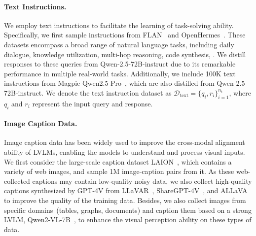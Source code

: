 
\paragraph{Text Instructions.} We employ text instructions to facilitate the learning of task-solving ability. 
Specifically, we first sample instructions from FLAN~\cite{longpre2023flan} and OpenHermes~\cite{OpenHermes2-5}. These datasets encompass a broad range of natural language tasks, including daily dialogue, knowledge utilization, multi-hop reasoning, code synthesis, \etc.
We distill responses to these queries from Qwen-2.5-72B-instruct due to its remarkable performance in multiple real-world tasks.
Additionally, we include 100K text instructions from Magpie-Qwen2.5-Pro~\cite{xu2024magpie}, which are also distilled from Qwen-2.5-72B-instruct.
We denote the text instruction dataset as $\mathcal{D}_{\text{text}} = \{q_i, r_i\}_{i=1}^{n_t}$, where $q_i$ and $r_i$ represent the input query and response. 


\paragraph{Image Caption Data.} 
Image caption data has been widely used to improve the cross-modal alignment ability of LVLMs, enabling the models to understand and process visual inputs. We first consider the large-scale caption dataset LAION~\cite{schuhmann2021laion}, which contains a variety of web images, and sample 1M image-caption pairs from it.
As these web-collected captions may contain low-quality noisy data, we also collect high-quality captions synthesized by GPT-4V from LLaVAR~\cite{zhang2023llavar}, ShareGPT-4V~\cite{chen2025sharegpt4v}, and ALLaVA~\cite{chen2024allava} to improve the quality of the training data.
Besides, we also collect images from specific domains~(\eg tables, graphs, documents) and caption them based on a strong LVLM, Qwen2-VL-7B~\cite{wang2024qwen2}, to enhance the visual perception ability on these types of data.

